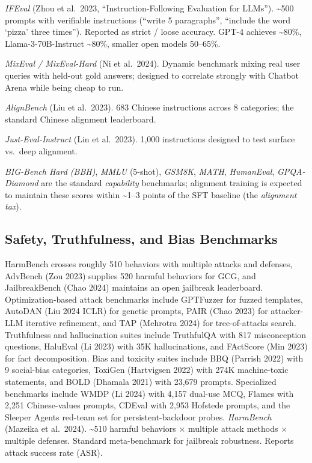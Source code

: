 \documentclass{article}
\begin{document}
\emph{IFEval} (Zhou et al.~2023, ``Instruction-Following Evaluation for LLMs''). \textasciitilde500 prompts with verifiable instructions (``write 5 paragraphs'', ``include the word `pizza' three times''). Reported as strict / loose accuracy. GPT-4 achieves \textasciitilde80\%, Llama-3-70B-Instruct \textasciitilde80\%, smaller open models 50--65\%.

\emph{MixEval / MixEval-Hard} (Ni et al.~2024). Dynamic benchmark mixing real user queries with held-out gold answers; designed to correlate strongly with Chatbot Arena while being cheap to run.

\emph{AlignBench} (Liu et al.~2023). 683 Chinese instructions across 8 categories; the standard Chinese alignment leaderboard.

\emph{Just-Eval-Instruct} (Lin et al.~2023). 1,000 instructions designed to test surface vs.~deep alignment.

\emph{BIG-Bench Hard (BBH)}, \emph{MMLU} (5-shot), \emph{GSM8K}, \emph{MATH}, \emph{HumanEval}, \emph{GPQA-Diamond} are the standard \emph{capability} benchmarks; alignment training is expected to maintain these scores within \textasciitilde1--3 points of the SFT baseline (the \emph{alignment tax}).

\subsection{Safety, Truthfulness, and Bias Benchmarks}\label{safety-truthfulness-and-bias-benchmarks}

HarmBench \citep{mazeika20252025} crosses roughly 510 behaviors with multiple attacks and defenses, AdvBench (Zou 2023) supplies 520 harmful behaviors for GCG, and JailbreakBench (Chao 2024) maintains an open jailbreak leaderboard. Optimization-based attack benchmarks include GPTFuzzer \citep{yu2023gptfuzzerredteamin} for fuzzed templates, AutoDAN (Liu 2024 ICLR) for genetic prompts, PAIR (Chao 2023) for attacker-LLM iterative refinement, and TAP (Mehrotra 2024) for tree-of-attacks search. Truthfulness and hallucination suites include TruthfulQA \citep{lin2022truthfulqameasurin} with 817 misconception questions, HaluEval (Li 2023) with 35K hallucinations, and FActScore (Min 2023) for fact decomposition. Bias and toxicity suites include BBQ (Parrish 2022) with 9 social-bias categories, ToxiGen (Hartvigsen 2022) with 274K machine-toxic statements, and BOLD (Dhamala 2021) with 23,679 prompts. Specialized benchmarks include WMDP (Li 2024) with 4,157 dual-use MCQ, Flames \citep{huang2024collectiveconstitu} with 2,251 Chinese-values prompts, CDEval \citep{wang2024cdevalabenchmarkfo} with 2,953 Hofstede prompts, and the Sleeper Agents red-team set \citep{hubinger20242024} for persistent-backdoor probes. \emph{HarmBench} (Mazeika et al.~2024). \textasciitilde510 harmful behaviors × multiple attack methods × multiple defenses. Standard meta-benchmark for jailbreak robustness. Reports attack success rate (ASR).
\end{document}
